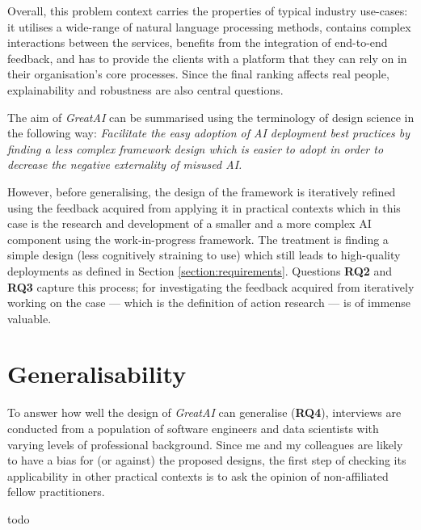Overall, this problem context carries the properties of typical industry use-cases: it utilises a wide-range of natural language processing methods, contains complex interactions between the services, benefits from the integration of end-to-end feedback, and has to provide the clients with a platform that they can rely on in their organisation's core processes. Since the final ranking affects real people, explainability and robustness are also central questions.

The aim of \textit{GreatAI} can be summarised using the terminology of design science in the following way: 
\textit{Facilitate the easy adoption of AI deployment best practices
by finding a less complex framework design 
which is easier to adopt
in order to decrease the negative externality of misused AI.}

However, before generalising, the design of the framework is iteratively refined using the feedback acquired from applying it in practical contexts which in this case is the research and development of a smaller and a more complex AI component using the work-in-progress framework. The treatment is finding a simple design (less cognitively straining to use) which still leads to high-quality deployments as defined in Section \ref{section:requirements}. Questions \textbf{RQ2} and \textbf{RQ3} capture this process; for investigating the feedback acquired from iteratively working on the case --- which is the definition of action research --- is of immense valuable. 

\section{Generalisability}

To answer how well the design of \textit{GreatAI} can generalise (\textbf{RQ4}), interviews are conducted from a population of software engineers and data scientists with varying levels of professional background. Since me and my colleagues are likely to have a bias for (or against) the proposed designs, the first step of checking its applicability in other practical contexts is to ask the opinion of non-affiliated fellow practitioners.

todo
